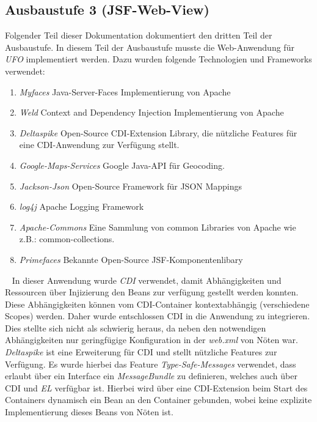 \documentclass[11pt, a4paper, twoside]{article}   	%
\begin{document}
\subsection{Ausbaustufe 3 (JSF-Web-View)}
Folgender Teil dieser Dokumentation dokumentiert den dritten Teil der Ausbaustufe. In diesem Teil der Ausbaustufe musste die Web-Anwendung für \emph{UFO} implementiert werden. Dazu wurden folgende Technologien und Frameworks verwendet:
\begin{enumerate}
	\item\emph{Myfaces}
	\newline
	Java-Server-Faces Implementierung von Apache
	\item\emph{Weld}
	\newline
	Context and Dependency Injection Implementierung von Apache
	\item\emph{Deltaspike}
	\newline
	Open-Source CDI-Extension Library, die nützliche Features für eine CDI-Anwendung zur Verfügung stellt.
	\item\emph{Google-Maps-Services}
	\newline
	Google Java-API für Geocoding.
	\item\emph{Jackson-Json}
	\newline
	Open-Source Framework für JSON Mappings
	\item\emph{log4j}
	\newline
	Apache Logging Framework
	\item\emph{Apache-Commons}
	\newline
	Eine Sammlung von common Libraries von Apache wie z.B.: common-collections.
	\item\emph{Primefaces}
	\newline
	Bekannte Open-Source JSF-Komponentenlibary
\end{enumerate}
\ \newline
In dieser Anwendung wurde \emph{CDI} verwendet, damit Abhängigkeiten und Ressourcen über 
Injizierung den Beans zur verfügung gestellt werden konnten. Diese Abhängigkeiten können vom CDI-Container kontextabhängig (verschiedene Scopes) werden. Daher wurde entschlossen CDI in die Anwendung zu integrieren. Dies stellte sich nicht als schwierig heraus, da neben den notwendigen Abhängigkeiten nur geringfügige Konfiguration in der \emph{web.xml} von Nöten war.
\newline
\newline
\emph{Deltaspike} ist eine Erweiterung für CDI und stellt nützliche Features zur Verfügung. Es wurde hierbei das Feature \emph{Type-Safe-Messages} verwendet, dass erlaubt über ein Interface ein \emph{MessageBundle} zu definieren, welches auch über CDI und \emph{EL} verfügbar ist. Hierbei wird über eine CDI-Extension beim Start des Containers dynamisch ein Bean an den Container gebunden, wobei keine explizite Implementierung dieses Beans von Nöten ist.
\end{document}
